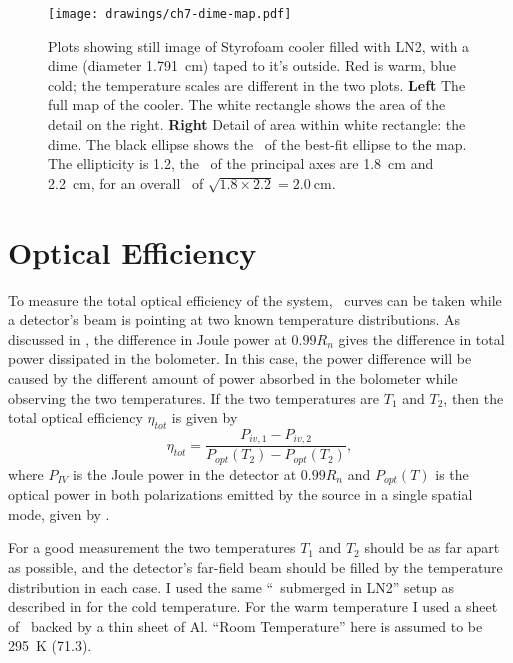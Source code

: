 \begin{figure}
\centering
\texttt{[image: drawings/ch7-dime-map.pdf]}
\caption[Image of LN2 cooler with dime]{
  Plots showing still image of Styrofoam cooler filled with LN2, with a dime (diameter \SI{1.791}{\cm}) taped to it's outside.
  Red is warm, blue cold; the temperature scales are different in the two plots.
  \textbf{Left} The full map of the cooler. The white rectangle shows the area of the detail on the right.
  \textbf{Right} Detail of area within white rectangle: the dime.
  The black ellipse shows the \FWHM\ of the best-fit ellipse to the map. The ellipticity is \num{1.2}, the \FWHM\ of the principal axes are \SI{1.8}{\cm} and \SI{2.2}{\cm}, for an overall \FWHM\ of $\sqrt{1.8 \times 2.2} = \SI{2.0}{\cm}$.
}
\label{fig:ch7-dime-map}
\end{figure}

\section{Optical Efficiency} \label{sec:ch7-opt-eff}

To measure the total optical efficiency of the system, \IV\ curves can be taken while a detector's beam is pointing at two known temperature distributions.
As discussed in , the difference in Joule power at $0.99 R_n$ gives the difference in total power dissipated in the bolometer.
In this case, the power difference will be caused by the different amount of power absorbed in the bolometer while observing the two temperatures.
If the two temperatures are $T_1$ and $T_2$, then the total optical efficiency $\eta_{tot}$ is given by
\begin{equation}
  \eta_{tot} = \frac{P_{iv,1} - P_{iv,2}}{P_{opt}(T_2) - P_{opt}(T_2)},
\end{equation}
where $P_{IV}$ is the Joule power in the detector at $0.99 R_n$ and $P_{opt}(T)$ is the optical power in both polarizations emitted by the source in a single spatial mode, given by .

For a good measurement the two temperatures $T_1$ and $T_2$ should be as far apart as possible, and the detector's far-field beam should be filled by the temperature distribution in each case.
I used the same ``\ecco\ submerged in LN2'' setup as described in  for the cold temperature.
For the warm temperature I used a sheet of \ecco\ backed by a thin sheet of Al.
``Room Temperature'' here is assumed to be \SI{295}{\kelvin} (\SI{71.3}{\fahrenheit}).


